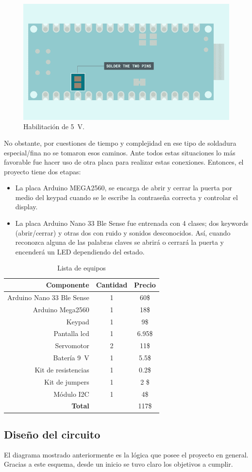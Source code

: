 \begin{figure}[H]
    \centering
    \includegraphics[width=.4\linewidth]{Img/pin_vusb.png}
    \caption{Habilitación de \SI{5}{\volt}.}
    \label{fig_usb}
\end{figure}
No obstante, por cuestiones de tiempo y complejidad en ese tipo de soldadura especial/fina no se tomaron esos caminos. Ante todos estas situaciones lo más favorable fue hacer uso de otra placa para realizar estas conexiones. Entonces, el proyecto tiene dos etapas:
\begin{itemize}
    \item La placa Arduino MEGA2560, se encarga de abrir y cerrar la puerta por medio del keypad cuando se le escribe la contraseña correcta y controlar el display.
    \item La placa Arduino Nano 33 Ble Sense fue entrenada con 4 clases; dos keywords (abrir/cerrar) y otras dos con ruido y sonidos desconocidos. Así, cuando reconozca alguna de las palabras claves se abrirá o cerrará la puerta y encenderá un LED dependiendo del estado.
\end{itemize}

\begin{table}[H]
\caption{Lista de equipos}
\label{table_2}
\begin{center}
\begin{tabular}{r|cc}
\hline
\textbf{Componente}&\textbf{Cantidad}&\textbf{Precio}\\
 \hline
Arduino Nano 33 Ble Sense& 1 &60\$ \\ \hline 
Arduino Mega2560& 1 & 18\$ \\ \hline 
Keypad& 1 &9\$ \\ \hline 
Pantalla lcd& 1 &6.95\$ \\ \hline 
Servomotor& 2 &11\$ \\ \hline 
Batería \SI{9}{\volt}& 1 &5.5\$ \\ \hline 
Kit de resistencias& 1 & 0.2\$ \\ \hline 
Kit de jumpers & 1 &2 \$ \\ \hline 
Módulo I2C & 1 & 4\$ \\ \hline 

 \textbf{Total}& & 117\$ \\
 \hline
\end{tabular}
\end{center}
\end{table}

\subsection*{Diseño del circuito}

El diagrama mostrado anteriormente es la lógica que posee el proyecto en general. Gracias a este esquema, desde un inicio se tuvo claro los objetivos a cumplir.

